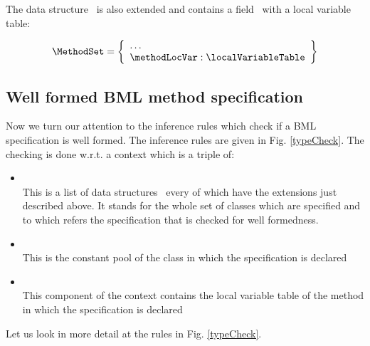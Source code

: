 
The data structure \MethodSet \ is also extended and contains a field   \methodLocVar  \  with a local variable table: %


 
 $$ \begin{array}{l}
         \MethodSet = \left\{\begin{array}{l} \ldots \\
				              \methodLocVar : \localVariableTable 	  
                    \end{array} \right\}
   \end{array}
$$


\subsection{Well formed BML method specification} \label{wfBML}
Now we turn our attention to the inference rules which check if a BML specification
is well formed. The inference rules are given in Fig. \ref{typeCheck}. The checking is done w.r.t.
a context which is a triple of:

\begin{itemize}
\item   \application\\
This is a list  of  data structures \ClassSet \ every of which have the extensions just described above.
It stands for the whole set of classes which are  specified and to which refers the specification that is checked for well formedness.

 \item  \constantPool \\
       This is the constant pool of the class in which the specification is declared
 
\item  \localVariableTable \\
This component of the context contains the local variable table of the method in which the specification is declared
\end{itemize}

Let us look in more detail at the rules in Fig.  \ref{typeCheck}.

